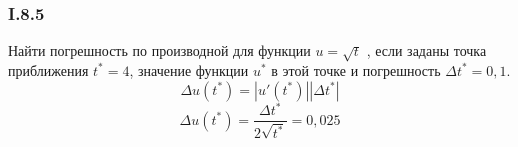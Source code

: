 \subsubsection*{I.8.5}
Найти погрешность по производной для функции $u=\sqrt{t}$ , если заданы точка приближения $t^* = 4$, значение функции $u^*$ в этой точке и погрешность $\Delta t^* = 0,1$.\\
$$\Delta u(t^*) = |u'(t^*)||\Delta t^*|$$
$$\Delta u(t^*) = \frac{\Delta t^*}{2 \sqrt{t^*}} = 0,025$$